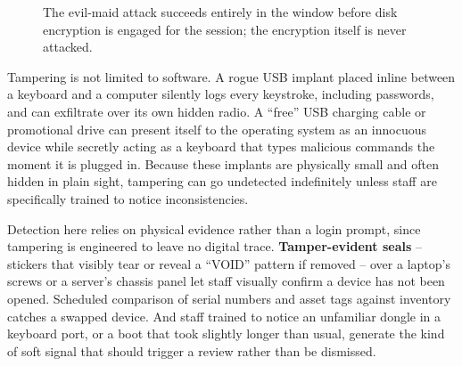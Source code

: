 \begin{figure}[h]
\centering
{}
\caption{The evil-maid attack succeeds entirely in the window before disk encryption is engaged
for the session; the encryption itself is never attacked.}
\label{fig:2.2-evil-maid}
\end{figure}

Tampering is not limited to software. A rogue USB implant placed inline between a keyboard and a
computer silently logs every keystroke, including passwords, and can exfiltrate over its own
hidden radio. A ``free'' USB charging cable or promotional drive can present itself to the
operating system as an innocuous device while secretly acting as a keyboard that types malicious
commands the moment it is plugged in. Because these implants are physically small and often
hidden in plain sight, tampering can go undetected indefinitely unless staff are specifically
trained to notice inconsistencies.

Detection here relies on physical evidence rather than a login prompt, since tampering is
engineered to leave no digital trace. \textbf{Tamper-evident seals} -- stickers that visibly tear
or reveal a ``VOID'' pattern if removed -- over a laptop's screws or a server's chassis panel let
staff visually confirm a device has not been opened. Scheduled comparison of serial numbers and
asset tags against inventory catches a swapped device. And staff trained to notice an unfamiliar
dongle in a keyboard port, or a boot that took slightly longer than usual, generate the kind of
soft signal that should trigger a review rather than be dismissed.

